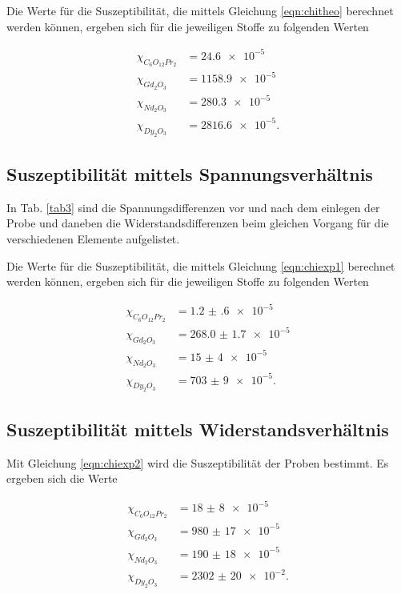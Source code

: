 
Die Werte für die Suszeptibilität, die mittels Gleichung \eqref{eqn:chitheo} berechnet werden können, ergeben sich für die jeweiligen Stoffe 
zu folgenden Werten 

\begin{align*} 
   \chi_{C_6 O_{12} Pr_2} &= \num{24.6e-5}\\
   \chi_{Gd_2 O_3} &= \num{1158.9e-5}\\
   \chi_{Nd_2 O_3} &= \num{280.3e-5}\\
   \chi_{Dy_2 O_3} &= \num{2816.6e-5}.
\end{align*}

\subsection{Suszeptibilität mittels Spannungsverhältnis}
In Tab. \ref{tab3} sind die Spannungsdifferenzen vor und nach dem einlegen der Probe und daneben die Widerstandsdifferenzen beim gleichen Vorgang für die verschiedenen Elemente aufgelistet.


Die Werte für die Suszeptibilität, die mittels Gleichung \eqref{eqn:chiexp1} berechnet werden können, ergeben sich für die jeweiligen Stoffe 
zu folgenden Werten 

\begin{align*} 
   \chi_{C_6 O_{12} Pr_2} &= \num{1.2(6)e-5}\\
   \chi_{Gd_2 O_3} &= \num{268.0(17)e-5}\\
   \chi_{Nd_2 O_3} &= \num{15(4)e-5}\\
   \chi_{Dy_2 O_3} &= \num{703(9)e-5}.
\end{align*}


\subsection{Suszeptibilität mittels Widerstandsverhältnis}
Mit Gleichung \eqref{eqn:chiexp2} wird die Suszeptibilität der Proben bestimmt.
Es ergeben sich die Werte

\begin{align*} 
   \chi_{C_6 O_{12} Pr_2} &= \num{18(8)e-5}\\
   \chi_{Gd_2 O_3} &= \num{980(17)e-5}\\
   \chi_{Nd_2 O_3} &= \num{190(18)e-5}\\
   \chi_{Dy_2 O_3} &= \num{2302(20)e-2}.
\end{align*}


